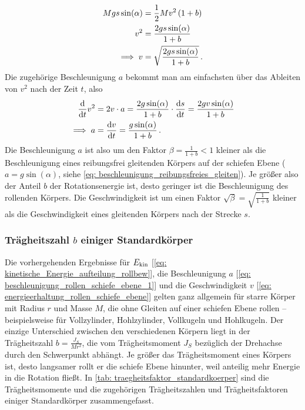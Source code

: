 \begin{equation}\begin{aligned}\label{eq: energieerhaltung_rollen_schiefe_ebene}
    M g s \sin(\alpha) &= \frac{1}{2} M v^2 \left( 1 + b \right) \\
    v^2 &= \frac{2 g s \sin(\alpha)}{1 + b} \\
    \implies v &= \sqrt{\frac{2 g s \sin(\alpha)}{1 + b}} \,.
\end{aligned}\end{equation}
Die zugehörige Beschleunigung $a$ bekommt man am einfachsten über das Ableiten von $v^2$ nach der Zeit $t$, also 
\begin{equation}\begin{aligned}\label{eq: beschleunigung_rollen_schiefe_ebene_1}
    \frac{\mathrm{d}}{\mathrm{d} t} v^2 &= 2 v \cdot a = \frac{2 g \sin(\alpha)}{1 + b} \cdot \frac{\mathrm{d} s}{\mathrm{d} t} = \frac{2 g v \sin(\alpha)}{1 + b} \\
    \implies a &= \frac{\mathrm{d} v}{\mathrm{d} t} = \frac{g \sin(\alpha)}{1 + b} \,.
\end{aligned}\end{equation}
Die Beschleunigung $a$ ist also um den Faktor $\beta = \frac{1}{1+b} < 1$ kleiner als die Beschleunigung eines reibungsfrei gleitenden Körpers auf der schiefen Ebene ($a = g \sin(\alpha)$, siehe \cref{eq: beschleunigung_reibungsfreies_gleiten}). Je größer also der Anteil $b$ der Rotationsenergie ist, desto geringer ist die Beschleunigung des rollenden Körpers. Die Geschwindigkeit ist um einen Faktor $\sqrt{\beta} = \sqrt{\frac{1}{1+b}}$ kleiner als die Geschwindigkeit eines gleitenden Körpers nach der Strecke $s$.

\subsubsection{Trägheitszahl $b$ einiger Standardkörper}\label{subsubsec: traegheit_b_standardkoerper}
Die vorhergehenden Ergebnisse für $E_{\mathrm{kin}}$ [\cref{eq: kinetische_Energie_aufteilung_rollbew}], die Beschleunigung $a$ [\cref{eq: beschleunigung_rollen_schiefe_ebene_1}] und die Geschwindigkeit $v$ [\cref{eq: energieerhaltung_rollen_schiefe_ebene}] gelten ganz allgemein für starre Körper mit Radius $r$ und Masse $M$, die ohne Gleiten auf einer schiefen Ebene rollen -- beispielsweise für Vollzylinder, Hohlzylinder, Vollkugeln und Hohlkugeln. Der einzige Unterschied zwischen den verschiedenen Körpern liegt in der Trägheitszahl $b = \frac{J_S}{M r^2}$, die vom Trägheitsmoment $J_S$ bezüglich der Drehachse durch den Schwerpunkt abhängt. Je größer das Trägheitsmoment eines Körpers ist, desto langsamer rollt er die schiefe Ebene hinunter, weil anteilig mehr Energie in die Rotation fließt. In \cref{tab: traegheitsfaktor_standardkoerper} sind die Trägheitsmomente und die zugehörigen Trägheitszahlen und Trägheitsfaktoren einiger Standardkörper zusammengefasst.

